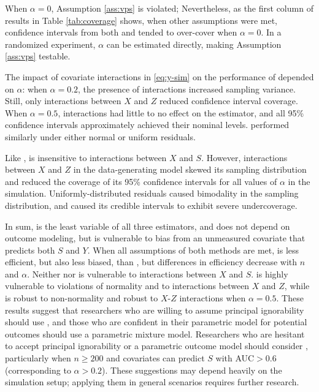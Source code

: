 \documentclass[]{article}
\begin{document}
When $\alpha=0$, Assumption \ref{ass:vps} is violated; %
Nevertheless, as the first column of results in Table \ref{tab:coverage} shows, when other assumptions were met, confidence intervals from both \geepers and \psw tended to over-cover when $\alpha=0$. 
In a randomized experiment, $\alpha$ can be estimated directly, making Assumption \ref{ass:vps} testable.

The impact of covariate interactions in \eqref{eq:y-sim} on the performance of \geepers depended on $\alpha$: when $\alpha=0.2$, the presence of interactions increased sampling variance. Still, only interactions between $X$ and $Z$ reduced confidence interval coverage. When $\alpha=0.5$, interactions had little to no effect on the \geepers estimator, and all 95\% confidence intervals approximately achieved their nominal levels. \geepers performed similarly under either normal or uniform residuals.

Like \geepers, \pmm is insensitive to interactions between $X$ and $S$. However, interactions between $X$ and $Z$ in the data-generating model skewed its sampling distribution and reduced the coverage of its 95\% confidence intervals for all values of $\alpha$ in the simulation. 
Uniformly-distributed residuals caused bimodality in the \pmm sampling distribution, and caused its credible intervals to exhibit severe undercoverage.

\label{simsum}In sum, \psw is the least variable of all three estimators, and does not depend on outcome modeling, but is vulnerable to bias from an unmeasured covariate that predicts both $S$ and $Y$.
When all assumptions of both methods are met, \geepers is less efficient, but also less biased, than \pmm, but differences in efficiency decrease with $n$ and $\alpha$.
Neither \psw nor \pmm is vulnerable to interactions between $X$ and $S$.
\pmm is highly vulnerable to violations of normality and to interactions between $X$ and $Z$, while \psw is robust to non-normality and robust to $X$-$Z$ interactions when $\alpha = 0.5$.
These results suggest that researchers who are willing to assume principal ignorability should use \psw, and those who are confident in their parametric model for potential outcomes should use a parametric mixture model. Researchers who are hesitant to accept principal ignorability or a parametric outcome model should consider \geepers, particularly when $n\ge 200$ and covariates can predict $S$ with AUC$>0.6$ (corresponding to $\alpha>0.2$).
These suggestions may depend heavily on the simulation setup; applying them in general scenarios requires further research. 
\end{document}
